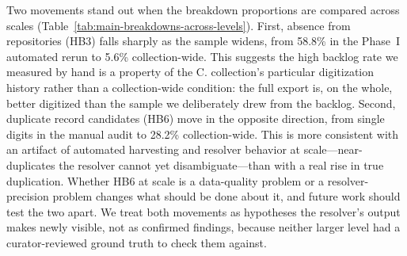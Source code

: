 Two movements stand out when the breakdown proportions are compared across scales
(Table~\ref{tab:main-breakdowns-across-levels}). First, absence from repositories
(HB3) falls sharply as the sample widens, from 58.8\% in the Phase~I automated
rerun to 5.6\% collection-wide. This suggests the high backlog rate we measured by
hand is a property of the C. collection's particular digitization history rather
than a collection-wide condition: the full export is, on the whole, better
digitized than the sample we deliberately drew from the backlog. Second, duplicate
record candidates (HB6) move in the opposite direction, from single digits in the
manual audit to 28.2\% collection-wide. This is more consistent with an artifact of
automated harvesting and resolver behavior at scale---near-duplicates the resolver
cannot yet disambiguate---than with a real rise in true duplication. Whether HB6 at
scale is a data-quality problem or a resolver-precision problem changes what should
be done about it, and future work should test the two apart. We treat both
movements as hypotheses the resolver's output makes newly visible, not as confirmed
findings, because neither larger level had a curator-reviewed ground truth to check
them against.
